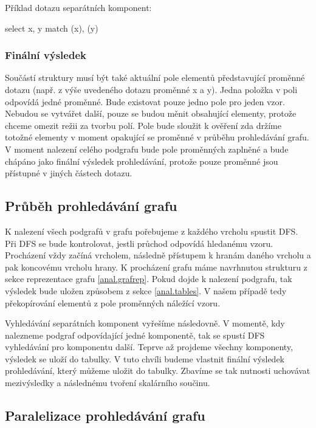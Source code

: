 Příklad dotazu separátních komponent:
\begin{code}
select x, y match (x), (y)
\end{code}

\subsubsection{Finální výsledek}

Součástí struktury musí být také aktuální pole elementů představující proměnné dotazu (např. z výše uvedeného dotazu proměnné x a y).
Jedna položka v poli odpovídá jedné proměnné.
Bude existovat pouze jedno pole pro jeden vzor. 
Nebudou se vytvářet další, pouze se budou měnit obsahující elementy, protože chceme omezit režii za tvorbu polí.
Pole bude sloužit k ověření zda držíme totožné elementy v moment opakující se proměnné v průběhu prohledávání grafu.
V moment nalezení celého podgrafu bude pole proměnných zaplněné a bude chápáno jako finální výsledek prohledávání, protože pouze proměnné jsou přístupné v jiných částech dotazu.

\subsection{Průběh prohledávání grafu}

K nalezení všech podgrafů v grafu pořebujeme z každého vrcholu spustit DFS.
Při DFS se bude kontrolovat, jestli průchod odpovídá hledanému vzoru.
Procházení vždy začíná vrcholem, následně přístupem k hranám daného vrcholu a pak koncovému vrcholu hrany. 
K procházení grafu máme navrhnutou strukturu z sekce reprezentace grafu \ref{anal.grafrep}.
Pokud dojde k nalezení podgrafu, tak výsledek bude uložen způsobem z sekce \ref{anal.tables}.
V našem případě tedy překopírování elementů z pole proměnných náležící vzoru.

Vyhledávání separátních komponent vyřešíme následovně.
V momentě, kdy nalezneme podgraf odpovídající jedné komponentě, tak se spustí DFS vyhledávání pro komponentu další.
Teprve až projdeme všechny komponenty, výsledek se uloží do tabulky.
V tuto chvíli budeme vlastnit finální výsledek prohledávání, který můžeme uložit do tabulky.
Zbavíme se tak nutnosti uchovávat mezivýsledky a následnému tvoření skalárního součinu.

\subsection{Paralelizace prohledávání grafu} \label{anal.matchPar}

